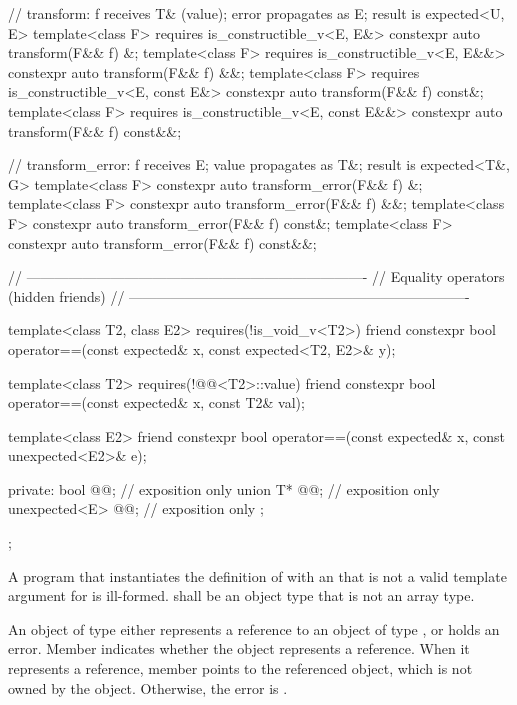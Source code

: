 \begin{codeblock}
{  // transform: f receives T& (value); error propagates as E; result is expected<U, E>
  template<class F>
    requires is_constructible_v<E, E&>
  constexpr auto transform(F&& f) &;
  template<class F>
    requires is_constructible_v<E, E&&>
  constexpr auto transform(F&& f) &&;
  template<class F>
    requires is_constructible_v<E, const E&>
  constexpr auto transform(F&& f) const&;
  template<class F>
    requires is_constructible_v<E, const E&&>
  constexpr auto transform(F&& f) const&&;

  // transform_error: f receives E; value propagates as T&; result is expected<T&, G>
  template<class F> constexpr auto transform_error(F&& f) &;
  template<class F> constexpr auto transform_error(F&& f) &&;
  template<class F> constexpr auto transform_error(F&& f) const&;
  template<class F> constexpr auto transform_error(F&& f) const&&;

  // -------------------------------------------------------------------------
  // Equality operators (hidden friends)
  // -------------------------------------------------------------------------

  template<class T2, class E2>
    requires(!is_void_v<T2>)
  friend constexpr bool operator==(const expected& x, const expected<T2, E2>& y);

  template<class T2>
    requires(!@@<T2>::value)
  friend constexpr bool operator==(const expected& x, const T2& val);

  template<class E2>
  friend constexpr bool operator==(const expected& x, const unexpected<E2>& e);

private:
  bool @@; // exposition only
  union {
    T* @@;             // exposition only
    unexpected<E> @@; // exposition only
  };
};
\end{codeblock}

\begin{itemdescr}
\pnum
\mandates
A program that instantiates the definition of  with an  that is not a valid template argument for  is ill-formed.  shall be an object type that is not an array type.

\pnum
\remarks
An object of type  either represents a reference to an object of type , or holds an error. Member  indicates whether the object represents a reference. When it represents a reference, member  points to the referenced object, which is not owned by the  object. Otherwise, the error is .
\end{itemdescr}

